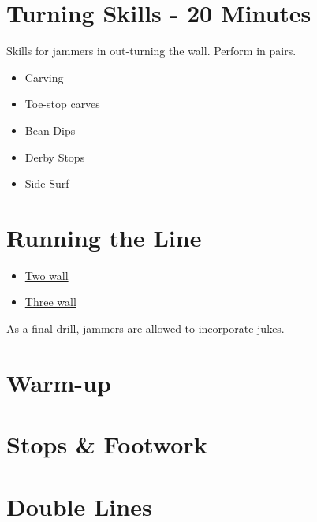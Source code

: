 \documentclass{journal}
\begin{document}
\section*{Turning Skills - 20 Minutes}
Skills for jammers in out-turning the wall.
Perform in pairs.

\begin{itemize}
\item Carving
\item Toe-stop carves
\item Bean Dips
\item Derby Stops 
\item Side Surf
\end{itemize}

\section*{Running the Line}

\begin{itemize}
\item \hyperref[drill:two_wall/double_lines]{Two wall}
\item \hyperref[drill:three_wall/double_lines]{Three wall}
\end{itemize}

As a final drill, jammers are allowed to incorporate jukes. 

\pagebreak
\section*{Warm-up}
\label{sec:warmup}


\section*{Stops \& Footwork}
\label{sec:footwork}





\section*{Double Lines}
\label{sec:double_lines}


\end{document}
